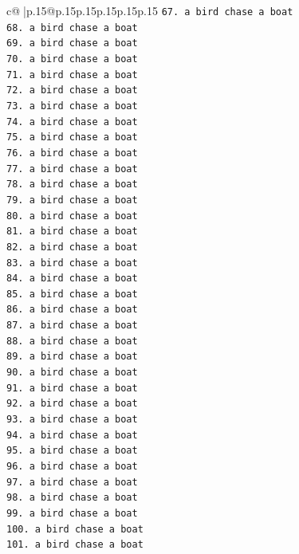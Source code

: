 \documentclass{article}
\begin{document}
{\begin{supertabular}{c@{$\;$}|p{.15\linewidth}@{}p{.15\linewidth}p{.15\linewidth}p{.15\linewidth}p{.15\linewidth}p{.15\linewidth}}
{{{\texttt{67. a bird chase a boat} \\
\texttt{68. a bird chase a boat} \\
\texttt{69. a bird chase a boat} \\
\texttt{70. a bird chase a boat} \\
\texttt{71. a bird chase a boat} \\
\texttt{72. a bird chase a boat} \\
\texttt{73. a bird chase a boat} \\
\texttt{74. a bird chase a boat} \\
\texttt{75. a bird chase a boat} \\
\texttt{76. a bird chase a boat} \\
\texttt{77. a bird chase a boat} \\
\texttt{78. a bird chase a boat} \\
\texttt{79. a bird chase a boat} \\
\texttt{80. a bird chase a boat} \\
\texttt{81. a bird chase a boat} \\
\texttt{82. a bird chase a boat} \\
\texttt{83. a bird chase a boat} \\
\texttt{84. a bird chase a boat} \\
\texttt{85. a bird chase a boat} \\
\texttt{86. a bird chase a boat} \\
\texttt{87. a bird chase a boat} \\
\texttt{88. a bird chase a boat} \\
\texttt{89. a bird chase a boat} \\
\texttt{90. a bird chase a boat} \\
\texttt{91. a bird chase a boat} \\
\texttt{92. a bird chase a boat} \\
\texttt{93. a bird chase a boat} \\
\texttt{94. a bird chase a boat} \\
\texttt{95. a bird chase a boat} \\
\texttt{96. a bird chase a boat} \\
\texttt{97. a bird chase a boat} \\
\texttt{98. a bird chase a boat} \\
\texttt{99. a bird chase a boat} \\
\texttt{100. a bird chase a boat} \\
\texttt{101. a bird chase a boat} \\
}}}
\end{supertabular}}
\end{document}
